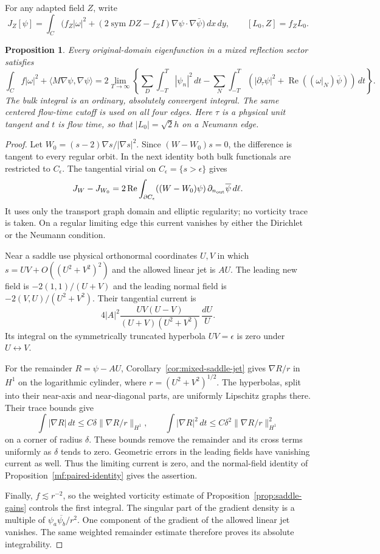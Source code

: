 \documentclass[reqno,11pt]{amsart}
\numberwithin{equation}{section}
\newtheorem{proposition}[theorem]{Proposition}
\theoremstyle{remark}
\begin{document}
For any adapted field $Z$, write
\[
 J_Z[\psi]=\int_C\bigl(f_Z|\omega|^2+
       (2\operatorname{sym}DZ-f_ZI)\nabla\psi\cdot\nabla\bar\psi\bigr)
       \,dx\,dy,\qquad [L_0,Z]=f_ZL_0.
\]
\begin{proposition}\label{prop:r5-new-virial}
Every original-domain eigenfunction in a mixed reflection sector satisfies
\[
 \int_C f|\omega|^2+\langle M\nabla\psi,\nabla\psi\rangle
 =2\lim_{T\to\infty}\left\{
 \sum_D\int_{-T}^{T}|\psi_n|^2\,dt
 -\sum_N\int_{-T}^{T}
       (|\partial_\tau\psi|^2+\operatorname{Re}((\omega|_N)\overline\psi))\,dt\right\}.
\]
The bulk integral is an ordinary, absolutely convergent integral. The
same centered flow-time cutoff is used on all four edges. Here
$\tau$ is a physical unit tangent and $t$ is flow time, so that
$|L_0|=\sqrt2 h$ on a Neumann edge.
\end{proposition}

\begin{proof}
Let $W_0=(s-2)\nabla s/|\nabla s|^2$. Since $(W-W_0)s=0$, the
difference is tangent to every regular orbit. In the next identity
both bulk functionals are restricted to $C_\epsilon$. The tangential virial on
$C_\epsilon=\{s>\epsilon\}$ gives
\[
 J_W-J_{W_0}
 =2\operatorname{Re}\int_{\partial C_\epsilon}
          ((W-W_0)\psi)\,\partial_{n_{\rm out}}\overline\psi\,d\ell.
\]
It uses only the transport graph domain and elliptic regularity; no
vorticity trace is taken. On a regular limiting edge this current vanishes
by either the Dirichlet or the Neumann condition.

Near a saddle use physical orthonormal coordinates $U,V$ in which
$s=UV+O((U^2+V^2)^2)$ and the allowed linear jet is $A U$. The leading
new field is $-2(1,1)/(U+V)$ and the leading normal field is
$-2(V,U)/(U^2+V^2)$. Their tangential current is
\[
 4|A|^2\frac{UV(U-V)}{(U+V)(U^2+V^2)}\,\frac{dU}{U}.
\]
Its integral on the symmetrically truncated hyperbola $UV=\epsilon$
is zero under $U\leftrightarrow V$.

For the remainder $R=\psi-AU$, Corollary~\ref{cor:mixed-saddle-jet} gives
$\nabla R/r$ in $H^1$ on the logarithmic cylinder, where
$r=(U^2+V^2)^{1/2}$. The hyperbolas, split into their near-axis and
near-diagonal parts, are uniformly Lipschitz graphs there. Their trace
bounds give
\[
 \int|\nabla R|\,dt\le C\delta\|\nabla R/r\|_{H^1},\qquad
 \int|\nabla R|^2\,dt\le C\delta^2\|\nabla R/r\|_{H^1}
 ^2
\]
on a corner of radius $\delta$. These bounds remove the remainder and
its cross terms uniformly as $\delta$ tends to zero. Geometric errors in
the leading fields have vanishing current as well. Thus the limiting
current is zero, and the normal-field identity of
Proposition~\ref{mf:paired-identity} gives
the assertion.

Finally, $f\lesssim r^{-2}$, so the weighted vorticity estimate of
Proposition~\ref{prop:saddle-gains} controls
the first integral. The singular part of the gradient density is a
multiple of $\psi_a\overline{\psi_b}/r^2$. One component of the gradient
of the allowed linear jet vanishes. The same weighted remainder estimate
therefore proves its absolute integrability.
\end{proof}
\end{document}
